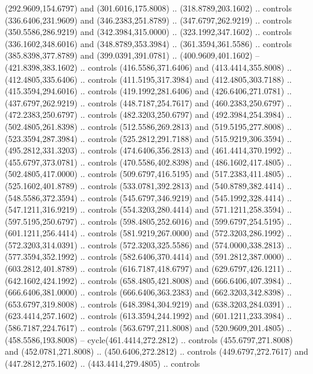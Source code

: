 {{\begin{scope}[y=-0.80pt,x=0.80pt,scale=0.038,xshift=-635pt,yshift=334pt]
        (292.9609,154.6797) and (301.6016,175.8008) .. (318.8789,203.1602) .. controls
        (336.6406,231.9609) and (346.2383,251.8789) .. (347.6797,262.9219) .. controls
        (350.5586,286.9219) and (342.3984,315.0000) .. (323.1992,347.1602) .. controls
        (336.1602,348.6016) and (348.8789,353.3984) .. (361.3594,361.5586) .. controls
        (385.8398,377.8789) and (399.0391,391.0781) .. (400.9609,401.1602) --
        (421.8398,383.1602) .. controls (416.5586,371.6406) and (413.4414,355.8008) ..
        (412.4805,335.6406) .. controls (411.5195,317.3984) and (412.4805,303.7188) ..
        (415.3594,294.6016) .. controls (419.1992,281.6406) and (426.6406,271.0781) ..
        (437.6797,262.9219) .. controls (448.7187,254.7617) and (460.2383,250.6797) ..
        (472.2383,250.6797) .. controls (482.3203,250.6797) and (492.3984,254.3984) ..
        (502.4805,261.8398) .. controls (512.5586,269.2813) and (519.5195,277.8008) ..
        (523.3594,287.3984) .. controls (525.2812,291.7188) and (515.9219,306.3594) ..
        (495.2812,331.3203) .. controls (474.6406,356.2813) and (461.4414,370.1992) ..
        (455.6797,373.0781) .. controls (470.5586,402.8398) and (486.1602,417.4805) ..
        (502.4805,417.0000) .. controls (509.6797,416.5195) and (517.2383,411.4805) ..
        (525.1602,401.8789) .. controls (533.0781,392.2813) and (540.8789,382.4414) ..
        (548.5586,372.3594) .. controls (545.6797,346.9219) and (545.1992,328.4414) ..
        (547.1211,316.9219) .. controls (554.3203,280.4414) and (571.1211,258.3594) ..
        (597.5195,250.6797) .. controls (598.4805,252.6016) and (599.6797,254.5195) ..
        (601.1211,256.4414) .. controls (581.9219,267.0000) and (572.3203,286.1992) ..
        (572.3203,314.0391) .. controls (572.3203,325.5586) and (574.0000,338.2813) ..
        (577.3594,352.1992) .. controls (582.6406,370.4414) and (591.2812,387.0000) ..
        (603.2812,401.8789) .. controls (616.7187,418.6797) and (629.6797,426.1211) ..
        (642.1602,424.1992) .. controls (658.4805,421.8008) and (666.6406,407.3984) ..
        (666.6406,381.0000) .. controls (666.6406,363.2383) and (662.3203,342.8398) ..
        (653.6797,319.8008) .. controls (648.3984,304.9219) and (638.3203,284.0391) ..
        (623.4414,257.1602) .. controls (613.3594,244.1992) and (601.1211,233.3984) ..
        (586.7187,224.7617) .. controls (563.6797,211.8008) and (520.9609,201.4805) ..
        (458.5586,193.8008) -- cycle(461.4414,272.2812) .. controls
        (455.6797,271.8008) and (452.0781,271.8008) .. (450.6406,272.2812) .. controls
        (449.6797,272.7617) and (447.2812,275.1602) .. (443.4414,279.4805) .. controls

\end{scope}}}
